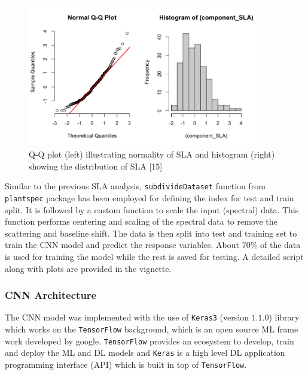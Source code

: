 \documentclass[12pt,a4paper]{report}
\begin{document}
\begin{figure}[h]
    \centering
    \includegraphics[width=0.9\textwidth]{Figures/hist_CNN.png}
    \caption{Q-Q plot (left) illustrating normality of SLA and histogram (right) showing the distribution of SLA [15]}
    \label{fig:hist_CNN}
\end{figure}

Similar to the previous SLA analysis, \texttt{subdivideDataset} function from \texttt{plantspec} package has been employed for defining the index for test and train split. It is followed by a custom function to scale the input (spectral) data. This function performs centering and scaling of the spectral data to remove the scattering and baseline shift. The data is then split into test and training set to train the CNN model and predict the response variables. About $70\%$ of the data is used for training the model while the rest is saved for testing. A detailed script along with plots are provided in the vignette.\\

\subsubsection*{CNN Architecture}
The CNN model was implemented with the use of \texttt{Keras3} (version $1.1.0$) library which works on the \texttt{TensorFlow} background, which is an open source ML frame work developed by google. \texttt{TensorFlow} provides an ecosystem to develop, train and deploy the ML and DL models and \texttt{Keras} is a high level DL application programming interface (API) which is built in top of \texttt{TensorFlow}. \\
\end{document}
